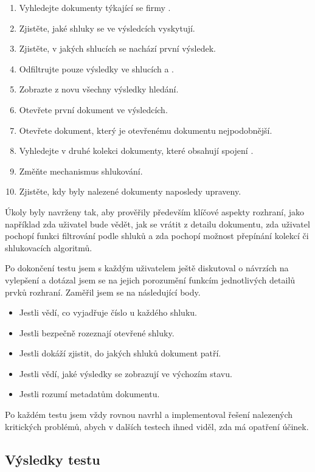 \begin{enumerate}
\item Vyhledejte dokumenty týkající se firmy .
\item Zjistěte, jaké shluky se ve výsledcích vyskytují.
\item Zjistěte, v jakých shlucích se nachází první výsledek.
\item \label{task_clusterfilter}Odfiltrujte pouze výsledky ve shlucích  a .
\item Zobrazte z novu všechny výsledky hledání.
\item Otevřete první dokument ve výsledcích.
\item Otevřete dokument, který je otevřenému dokumentu nejpodobnější.
\item Vyhledejte v druhé kolekci dokumenty, které obsahují spojení .
\item \label{task_engine}Změňte mechanismus shlukování.
\item Zjistěte, kdy byly nalezené dokumenty naposledy upraveny.
\end{enumerate}

Úkoly byly navrženy tak, aby prověřily především klíčové aspekty rozhraní, jako například zda uživatel bude vědět, jak se vrátit z detailu dokumentu, zda uživatel pochopí funkci filtrování podle shluků a zda pochopí možnost přepínání kolekcí či shlukovacích algoritmů.

Po dokončení testu jsem s každým uživatelem ještě diskutoval o návrzích na vylepšení a dotázal jsem se na jejich porozumění funkcím jednotlivých detailů prvků rozhraní. Zaměřil jsem se na následující body.

\begin{itemize}
\item Jestli vědí, co vyjadřuje číslo u každého shluku.
\item Jestli bezpečně rozeznají otevřené shluky.
\item Jestli dokáží zjistit, do jakých shluků dokument patří.
\item Jestli vědí, jaké výsledky se zobrazují ve výchozím stavu.
\item Jestli rozumí metadatům dokumentu.
\end{itemize}

Po každém testu jsem vždy rovnou navrhl a implementoval řešení nalezených kritických problémů, abych v dalších testech ihned viděl, zda má opatření účinek.

\subsection{Výsledky testu}
